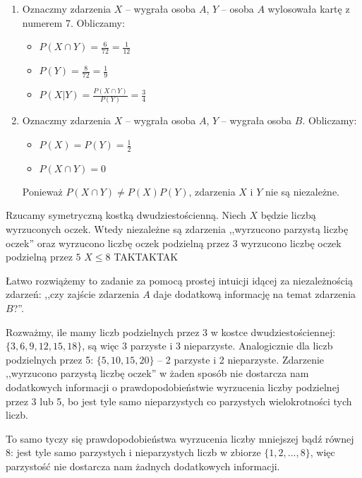 \begin{solutions}
\begin{enumerate}[\bf A.]
        \item Oznaczmy zdarzenia $X$ -- wygrała osoba $A$, $Y$ -- osoba $A$ wylosowała kartę z numerem 7. Obliczamy:
        \begin{itemize}
            \item $P(X \cap Y) = \frac{6}{72} = \frac{1}{12}$
            \item $P(Y) = \frac{8}{72} = \frac{1}{9}$
            \item $P(X | Y) = \frac{P(X \cap Y)}{P(Y)} = \frac{3}{4}$
        \end{itemize}

        \item Oznaczmy zdarzenia $X$ -- wygrała osoba $A$, $Y$ -- wygrała osoba $B$. Obliczamy:
        \begin{itemize}
            \item $P(X) = P(Y) = \frac{1}{2}$
            \item $P(X \cap Y) = 0$
        \end{itemize}
        Ponieważ $P(X \cap Y) \neq P(X)P(Y)$, zdarzenia $X$ i $Y$ nie są niezależne.
    \end{enumerate}

    \sol Rzucamy symetryczną kostką dwudziestościenną. Niech $X$ będzie liczbą wyrzuconych oczek. Wtedy niezależne są zdarzenia ,,wyrzucono parzystą liczbę oczek'' oraz
    \answerss
    {wyrzucono liczbę oczek podzielną przez $3$}
    {wyrzucono liczbę oczek podzielną przez $5$}
    {$X \leq 8$}
    {TAK}{TAK}{TAK}

    Łatwo rozwiążemy to zadanie za pomocą prostej intuicji idącej za niezależnością zdarzeń: ,,czy zajście zdarzenia $A$ daje dodatkową informację na temat zdarzenia $B$?''.
    
    Rozważmy, ile mamy liczb podzielnych przez 3 w kostce dwudziestościennej: $\{3, 6, 9, 12, 15, 18\}$, są więc 3 parzyste i 3 nieparzyste. Analogicznie dla liczb podzielnych przez 5: $\{5, 10, 15, 20\}$ -- 2 parzyste i 2 nieparzyste. Zdarzenie ,,wyrzucono parzystą liczbę oczek'' w żaden sposób nie dostarcza nam dodatkowych informacji o prawdopodobieństwie wyrzucenia liczby podzielnej przez 3 lub 5, bo jest tyle samo nieparzystych co parzystych wielokrotności tych liczb.
    
    To samo tyczy się prawdopodobieństwa wyrzucenia liczby mniejszej bądź równej 8: jest tyle samo parzystych i nieparzystych liczb w zbiorze $\{1, 2, ..., 8\}$, więc parzystość nie dostarcza nam żadnych dodatkowych informacji. 
    

\end{solutions}
